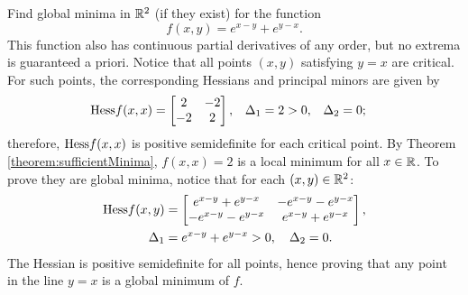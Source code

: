 \begin{example}
Find global minima in $\mathbb{R}^2$ (if they exist) for the function
\begin{equation*}
f(x,y) = e^{x-y} + e^{y-x}.
\end{equation*}
This function also has continuous partial derivatives of any order, but no extrema is guaranteed a priori.  Notice that all points $(x, y)$ satisfying $y = x$ are critical.  For such points, the corresponding Hessians and principal minors are given by
\begin{align*}
\mathop{\mathrm{Hess}{f}}(x,x) &= \begin{bmatrix} 2 & -2 \\ -2 & 2 \end{bmatrix}, & \Delta_1 &= 2 >0, & \Delta_2 &= 0;
\end{align*}
therefore, $\mathop{\mathrm{Hess}{f}}(x,x)$ is positive semidefinite for each critical point.  By Theorem \ref{theorem:sufficientMinima}, $f(x,x) = 2$ is a local minimum for all $x \in \mathbb{R}$.  To prove they are global minima, notice that for each $(x,y) \in \mathbb{R}^2$:
\begin{align*}
\mathop{\mathrm{Hess}{f}}(x,y) &= \begin{bmatrix} e^{x-y}+e^{y-x} & -e^{x-y}-e^{y-x} \\ -e^{x-y} - e^{y-x} & e^{x-y}+e^{y-x} \end{bmatrix}, \\
\Delta_1 &= e^{x-y}+e^{y-x} > 0, \quad \Delta_2 =0.
\end{align*}
The Hessian is positive semidefinite for all points, hence proving that any point in the line $y=x$ is a global minimum of $f$.
\end{example}

